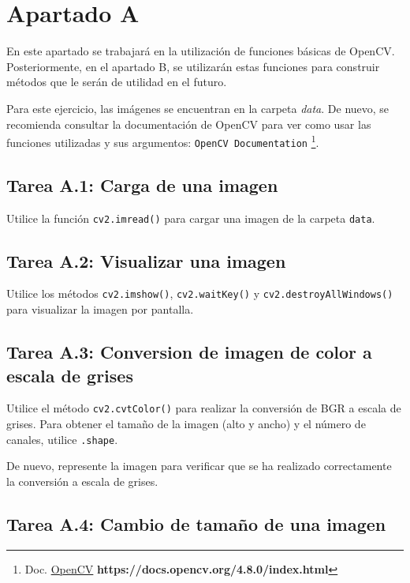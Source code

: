 \chapter{Apartado A}
\label{chapter:tarea_a}

En este apartado se trabajará en la utilización de funciones básicas de OpenCV. Posteriormente, en el apartado B, se utilizarán estas funciones para construir métodos que le serán de utilidad en el futuro.


Para este ejercicio, las imágenes se encuentran en la carpeta \textit{data}. De nuevo, se recomienda consultar la documentación de OpenCV para ver como usar las funciones utilizadas y sus argumentos: \texttt{OpenCV Documentation} \footnote{Doc. \href{https://docs.opencv.org/4.8.0/index.html}{OpenCV} \textbf{https://docs.opencv.org/4.8.0/index.html}}. 


\section*{Tarea A.1: Carga de una imagen}
Utilice la función  \texttt{cv2.imread()} para cargar una imagen de la carpeta \texttt{data}.


\section*{Tarea A.2: Visualizar una imagen}
Utilice los métodos \texttt{cv2.imshow()}, \texttt{cv2.waitKey()} y \texttt{cv2.destroyAllWindows()} para visualizar la imagen por pantalla.


\section*{Tarea A.3: Conversion de imagen de color a escala de grises}
Utilice el método \texttt{cv2.cvtColor()} para realizar la conversión de BGR a escala de grises. Para obtener el tamaño de la imagen (alto y ancho) y el número de canales, utilice \texttt{.shape}. 

De nuevo, represente la imagen para verificar que se ha realizado correctamente la conversión a escala de grises.


\section*{Tarea A.4: Cambio de tamaño de una imagen}


